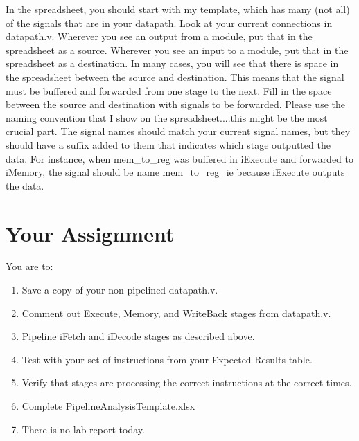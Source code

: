 In the spreadsheet, you should start with my template, which has many (not all) of the signals that are in your datapath.  Look at your current connections in datapath.v.  Wherever you see an output from a module, put that in the spreadsheet as a source.  Wherever you see an input to a module, put that in the spreadsheet as a destination.  In many cases, you will see that there is space in the spreadsheet between the source and destination.  This means that the signal must be buffered and forwarded from one stage to the next.  Fill in the space between the source and destination with signals to be forwarded.  Please use the naming convention that I show on the spreadsheet....this might be the most crucial part.  The signal names should match your current signal names, but they should have a suffix added to them that indicates which stage outputted the data.  For instance, when mem\_to\_reg was buffered in iExecute and forwarded to iMemory, the signal should be name mem\_to\_reg\_ie because iExecute outputs the data. 


\section{Your Assignment}

You are to:
\begin{enumerate}
\item Save a copy of your non-pipelined datapath.v.
\item Comment out Execute, Memory, and WriteBack stages from datapath.v.
\item Pipeline iFetch and iDecode stages as described above.   
\item Test with your set of instructions from your Expected Results table.
\item Verify that stages are processing the correct instructions at the correct times.
\item Complete PipelineAnalysisTemplate.xlsx
\item There is no lab report today.
\end{enumerate} 